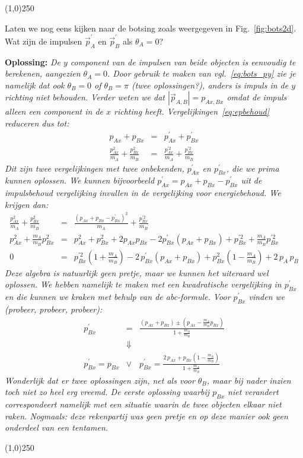 \begin{center}
\line(1,0){250}
\end{center}
\begin{voorbeeld} \label{ex:bots2}
Laten we nog eens kijken naar de botsing zoals weergegeven in Fig.~\ref{fig:bots2d}. Wat zijn
de impulsen $\vec{p}_A^{\prime}$ en $\vec{p}_B^{\prime}$ als $\theta_A=0$?

{\bf Oplossing: }{\it De $y$ component van de impulsen van beide objecten is eenvoudig te berekenen,
aangezien $\theta_A=0$. Door gebruik te maken van vgl.~\ref{eq:bots_py} zie je namelijk dat ook
$\theta_B=0$ of $\theta_B=\pi$ (twee oplossingen?), anders is impuls in de $y$ richting niet behouden. 
Verder weten we dat $|\vec{p}_{A,B}|=p_{Ax,Bx}$
omdat de impuls alleen een component in de $x$ richting heeft.  Vergelijkingen~\ref{eq:epbehoud} reduceren
dus tot:
\begin{eqnarray}
p_{Ax}+p_{Bx} & = & p_{Ax}^{\prime}+p_{Bx}^{\prime} \\
\frac{p_{Ax}^2}{m_A}+\frac{p_{Bx}^2}{m_B} & = & \frac{p_{Ax}^{\prime 2}}{m_A}+\frac{p_{Bx}^{\prime2}}{m_B}
\end{eqnarray}
Dit zijn twee vergelijkingen met twee onbekenden, $p_{Ax}^{\prime}$ en $p_{Bx}^{\prime}$, die we prima
kunnen oplossen. We kunnen bijvoorbeeld $p_{Ax}^{\prime} = p_{Ax}+p_{Bx}-p_{Bx}^{\prime}$ uit de impulsbehoud
vergelijking invullen in de vergelijking voor energiebehoud. We krijgen dan:
\begin{eqnarray}
\frac{p_{Ax}^2}{m_A}+\frac{p_{Bx}^2}{m_B} & = & \frac{\left(p_{Ax}+p_{Bx}-p_{Bx}^{\prime}\right)^2}{m_A}+\frac{p_{Bx}^{\prime2}}{m_B} \\
p_{Ax}^2+\frac{m_A}{m_B} p_{Bx}^2 & = &  p_{Ax}^2+p_{Bx}^2+2p_{Ax} p_{Bx}-2p_{Bx}^{\prime}(p_{Ax}+p_{Bx})+p_{Bx}^{\prime2} +\frac{m_A}{m_B}p_{Bx}^{\prime2}\\
0 & = & p_{Bx}^{\prime2}\left(1+\frac{m_A}{m_B}\right)-2\,p_{Bx}^{\prime}(p_{Ax}+p_{Bx})+p_{Bx}^2(1-\frac{m_A}{m_B})+2\,p_A\,p_B
\end{eqnarray}
Deze algebra is natuurlijk geen pretje, maar we kunnen het uiteraard wel oplossen. We hebben namelijk te
maken met een kwadratische vergelijking in $p_{Bx}^{\prime}$ en die kunnen we kraken met behulp van de
abc-formule. Voor $p_{Bx}^{\prime}$ vinden we (\emph{probeer, probeer, probeer}):
\begin{eqnarray}
p_{Bx}^{\prime} & = & \frac{(p_{Ax}+p_{Bx})\pm(p_{Ax}-\frac{m_A}{m_B} p_{Bx})}{1+\frac{m_A}{m_B}}\\
&\Downarrow &\\
p_{Bx}^{\prime} = p_{Bx} & \vee & p_{Bx}^{\prime} = \frac{2\,p_{Ax}+p_{Bx}(1-\frac{m_A}{m_B})}{1+\frac{m_A}{m_B}}
\end{eqnarray}
Wonderlijk dat er twee oplossingen zijn, net als voor $\theta_B$, maar bij nader inzien toch niet zo heel erg vreemd.
De eerste oplossing waarbij $p_{Bx}$ niet verandert correspondeert namelijk met een situatie waarin de
twee objecten elkaar niet raken. Nogmaals: deze rekenpartij was geen pretje en op deze manier ook geen onderdeel van
een tentamen.
}
\end{voorbeeld}
\begin{center}
\line(1,0){250}
\end{center}

